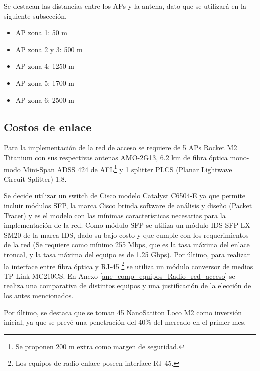 \documentclass[12pt,a4paper]{book}
\begin{document}
\medskip

Se destacan las distancias entre los APs y la antena, dato que se utilizará en la siguiente subsección.

\medskip

\begin{itemize}

\item AP zona 1: 50 m
\item AP zona 2 y 3: 500 m
\item AP zona 4: 1250 m
\item AP zona 5: 1700 m
\item AP zona 6: 2500 m

\end{itemize}


\subsection{Costos de enlace}

Para la implementación de la red de acceso se requiere de 5 APs Rocket M2 Titanium con sus respectivas antenas AMO-2G13, 6.2 km de fibra óptica mono-modo Mini-Span ADSS 424 de AFL\footnote{Se proponen 200 m extra como margen de seguridad.} y 1 splitter PLCS (Planar Lightwave Circuit Splitter) 1:8.

\medskip 

Se decide utilizar un switch de Cisco modelo Catalyst C6504-E ya que permite incluir módulos SFP, la marca Cisco brinda software de análisis y diseño (Packet Tracer) y es el modelo con las mínimas características necesarias para la implementación de la red. Como módulo SFP se utiliza un módulo IDS-SFP-LX-SM20 de la marca IDS, dado su bajo costo y que cumple con los requerimientos de la red (Se requiere como mínimo 255 Mbps, que es la tasa máxima del enlace troncal, y la tasa máxima del equipo es de 1.25 Gbps). Por último, para realizar la interface entre fibra óptica y RJ-45 \footnote{Los equipos de radio enlace poseen interface RJ-45.} se utiliza un módulo conversor de medios TP-Link MC210CS. En Anexo \ref{ane_comp_equipos_Radio_red_acceso} se realiza una comparativa de distintos equipos y una justificación de la elección de los antes mencionados.

\medskip

Por último, se destaca que se toman 45 NanoSatiton Loco M2 como inversión inicial, ya que se prevé una penetración del 40\% del mercado en el primer mes.

\medskip 
\end{document}
